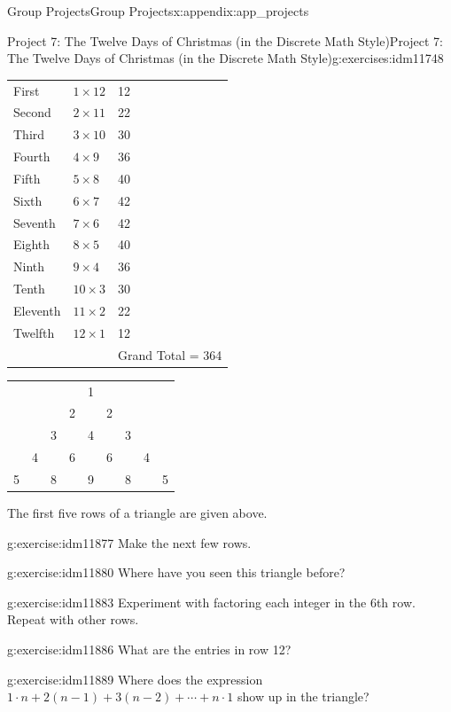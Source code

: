 \documentclass[oneside,10pt,]{book}
\numberwithin{equation}{chapter}
\begin{document}
\begin{appendixptx}{Group Projects}{}{Group Projects}{}{}{x:appendix:app_projects}
\begin{exercises-section-numberless}{Project 7: The Twelve Days of Christmas (in the Discrete Math Style)}{}{Project 7: The Twelve Days of Christmas (in the Discrete Math Style)}{}{}{g:exercises:idm11748}
\begin{introduction}{}
\begin{sidebyside}{1}{0.2}{0.2}{0}
\begin{sbspanel}{0.6}
{\begin{tabular}{lll}
First&\(1 \times 12\)&12\tabularnewline[0pt]
Second&\(2 \times 11\)&22\tabularnewline[0pt]
Third&\(3 \times 10\)&30\tabularnewline[0pt]
Fourth&\(4 \times 9\)&36\tabularnewline[0pt]
Fifth&\(5 \times 8\)&40\tabularnewline[0pt]
Sixth&\(6 \times 7\)&42\tabularnewline[0pt]
Seventh&\(7 \times 6\)&42\tabularnewline[0pt]
Eighth&\(8 \times 5\)&40\tabularnewline[0pt]
Ninth&\(9 \times 4\)&36\tabularnewline[0pt]
Tenth&\(10 \times 3\)&30\tabularnewline[0pt]
Eleventh&\(11 \times 2\)&22\tabularnewline[0pt]
Twelfth&\(12 \times 1\)&12\tabularnewline[0pt]
&&Grand Total = 364
\end{tabular}
\par}
\end{sbspanel}%
\end{sidebyside}%
\begin{sidebyside}{1}{0.1}{0.1}{0}%
\begin{sbspanel}{0.8}%
{\centering%
\begin{tabular}{lllllllll}
&&&&1&&&&\tabularnewline[0pt]
&&&2&&2&&&\tabularnewline[0pt]
&&3&&4&&3&&\tabularnewline[0pt]
&4&&6&&6&&4&\tabularnewline[0pt]
5&&8&&9&&8&&5
\end{tabular}
\par}
\end{sbspanel}%
\end{sidebyside}%
\par
The first five rows of a triangle are given above.%
\end{introduction}%
\begin{divisionexercise}{1}{}{}{g:exercise:idm11877}%
Make the next few rows.%
\end{divisionexercise}%
\begin{divisionexercise}{2}{}{}{g:exercise:idm11880}%
Where have you seen this triangle before?%
\end{divisionexercise}%
\begin{divisionexercise}{3}{}{}{g:exercise:idm11883}%
Experiment with factoring each integer in the 6th row. Repeat with other rows.%
\end{divisionexercise}%
\begin{divisionexercise}{4}{}{}{g:exercise:idm11886}%
What are the entries in row 12?%
\end{divisionexercise}%
\begin{divisionexercise}{5}{}{}{g:exercise:idm11889}%
Where does the expression \(1 \cdot n + 2\left( n - 1 \right) + 3\left( n - 2 \right) + \cdots + n \cdot 1\) show up in the triangle?%
\end{divisionexercise}%

\end{exercises-section-numberless}
\end{appendixptx}
\end{document}
